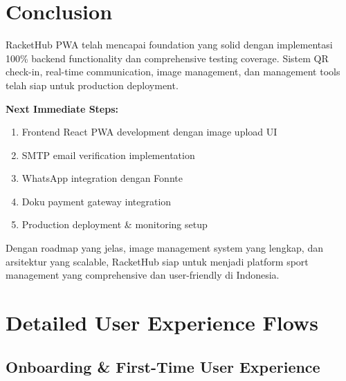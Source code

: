 \documentclass[12pt,a4paper]{article}
\begin{document}
\section{Conclusion}

RacketHub PWA telah mencapai foundation yang solid dengan implementasi 100\% backend functionality dan comprehensive testing coverage. Sistem QR check-in, real-time communication, image management, dan management tools telah siap untuk production deployment.

\begin{warningbox}
\textbf{Next Immediate Steps:}
\begin{enumerate}
    \item Frontend React PWA development dengan image upload UI
    \item SMTP email verification implementation  
    \item WhatsApp integration dengan Fonnte
    \item Doku payment gateway integration
    \item Production deployment \& monitoring setup
\end{enumerate}
\end{warningbox}

Dengan roadmap yang jelas, image management system yang lengkap, dan arsitektur yang scalable, RacketHub siap untuk menjadi platform sport management yang comprehensive dan user-friendly di Indonesia.

\section{Detailed User Experience Flows}

\subsection{Onboarding \& First-Time User Experience}
\end{document}
